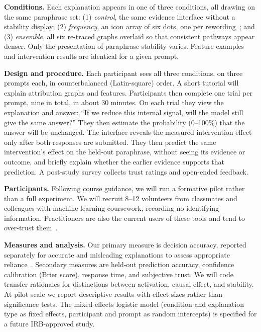 \documentclass[sigconf,balance=false]{acmart}
\begin{document}
\textbf{Conditions.}
Each explanation appears in one of three conditions, all drawing on the same paraphrase set:
(1) \emph{control}, the same evidence interface without a stability display;
(2) \emph{frequency}, an icon array of six dots, one per rewording~\cite{padilla2022uncertainty}; and
(3) \emph{ensemble}, all six re-traced graphs overlaid so that consistent pathways appear denser.
Only the presentation of paraphrase stability varies. Feature examples and intervention results are identical for a given prompt.

\textbf{Design and procedure.}
Each participant sees all three conditions, on three prompts each, in counterbalanced (Latin-square) order. A short tutorial will explain attribution graphs and features. Participants then complete one trial per prompt, nine in total, in about 30 minutes. On each trial they view the explanation and answer: ``If we reduce this internal signal, will the model still give the same answer?'' They then estimate the probability (0--100\%) that the answer will be unchanged. The interface reveals the measured intervention effect only after both responses are submitted. They then predict the same intervention's effect on the held-out paraphrase, without seeing its evidence or outcome, and briefly explain whether the earlier evidence supports that prediction. A post-study survey collects trust ratings and open-ended feedback.

\textbf{Participants.}
Following course guidance, we will run a formative pilot rather than a full experiment. We will recruit 8--12 volunteers from classmates and colleagues with machine learning coursework, recording no identifying information. Practitioners are also the current users of these tools and tend to over-trust them~\cite{kaur2020interpreting}.

\textbf{Measures and analysis.}
Our primary measure is decision accuracy, reported separately for accurate and misleading explanations to assess appropriate reliance~\cite{kim2024notsure}. Secondary measures are held-out prediction accuracy, confidence calibration (Brier score), response time, and subjective trust. We will code transfer rationales for distinctions between activation, causal effect, and stability. At pilot scale we report descriptive results with effect sizes rather than significance tests. The mixed-effects logistic model (condition and explanation type as fixed effects, participant and prompt as random intercepts) is specified for a future IRB-approved study.
\end{document}
